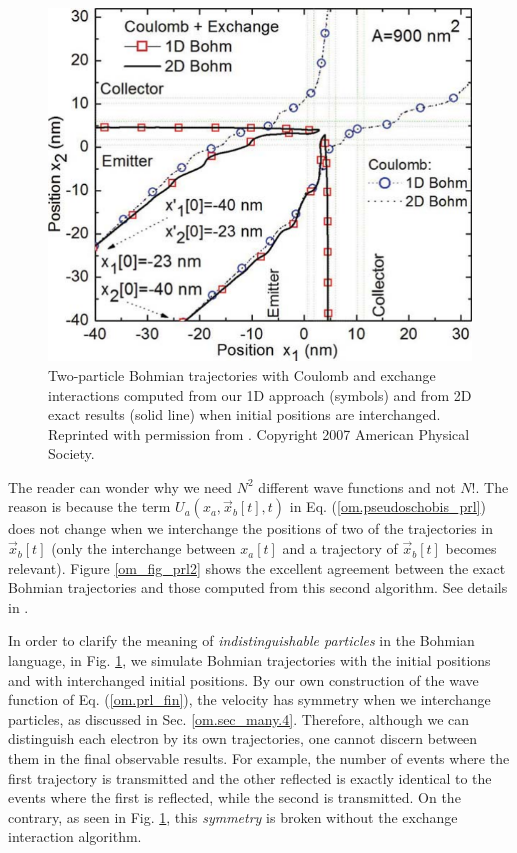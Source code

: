 \documentclass[nofootinbib, secnumarabic, amsmath, nobibnotes,11pt,aps,pra, floatfix]{revtex4-1}
\newcommand{\fref}[1]{Fig. \ref{#1}}
\newcommand{\sref}[1]{Sec. \ref{#1}}
\newcommand{\eref}[1]{Eq. (\ref{#1})}
\newcommand{\Fref}[1]{Figure \ref{#1}}
\begin{document}
\begin{figure}
\centering
\includegraphics{F1_08.pdf}
\caption{Two-particle Bohmian trajectories with Coulomb and exchange interactions computed from
our 1D approach (symbols) and from 2D exact results (solid line)
when initial positions are interchanged. Reprinted with permission
from \cite{om.oriolsprl}. Copyright 2007 American Physical Society.
} \label{om_fig_prl3}
\end{figure}

The reader can wonder why we need $N^2$ different wave functions and not $N!$. The reason is because the term \textit{$U_{a}(x_{a},\vec x_{b}[t],t)$} in \eref{om.pseudoschobis_prl} does not change when we interchange the positions of two of the trajectories in $\vec x_{b}[t]$ (only the interchange between $x_a[t]$ and a trajectory of $\vec x_{b}[t]$ becomes relevant). \Fref{om_fig_prl2} shows the excellent agreement between the exact Bohmian trajectories and those computed from this second algorithm. See details in \cite{om.oriolsprl}.

In order to clarify the meaning of \textit{indistinguishable
particles} in the Bohmian language, in \fref{om_fig_prl3},
we  simulate Bohmian trajectories with the
initial positions and with interchanged initial positions. By our
own construction of the wave function of \eref{om.prl_fin}, the
velocity has symmetry when we interchange particles, as discussed in
\sref{om.sec_many.4}. Therefore, although we can distinguish each
electron by its own trajectories, one cannot discern between them in
the final observable results. For example, the number of events
where the first trajectory is transmitted and the other reflected is
exactly identical to the events where the first is reflected, while
the second is transmitted. On the contrary, as seen in
\fref{om_fig_prl3}, this \textit{symmetry} is broken without the
exchange interaction algorithm.
\end{document}
